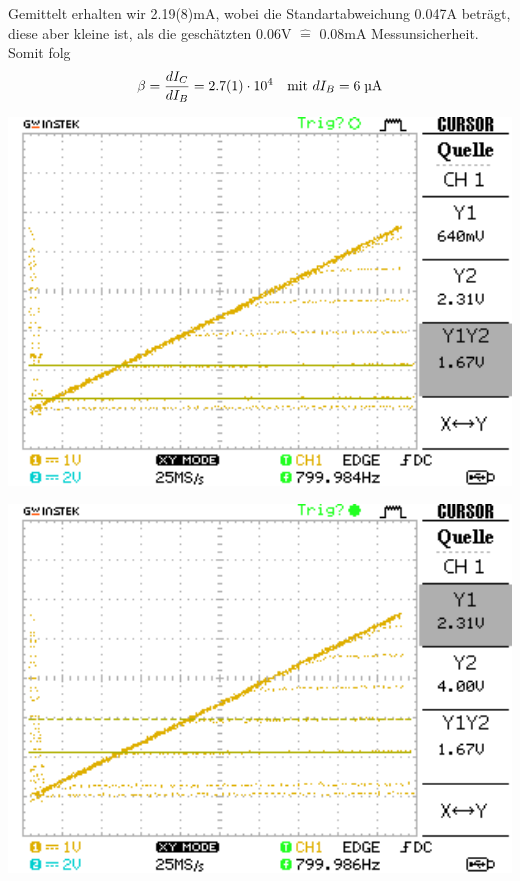 \documentclass[10pt]{article}
\newenvironment{Figure}
  {\par\medskip\noindent\minipage{\linewidth}}
  {\endminipage\par\medskip}
\begin{document}
\begin{multicols}{2}
\begin{center}
		\label{Tab:1.1}
	\end{center}
  Gemittelt erhalten wir 2.19(8)\;mA, wobei die Standartabweichung 0.047\;A beträgt, diese aber kleine ist, als die geschätzten 0.06\;V $\hat{=}$ 0.08\;mA Messunsicherheit. Somit folg
	\begin{align*}
		\beta & = \frac{dI_C}{dI_B} = 2.7(1) \cdot 10^4 & \text{mit } dI_B = 6\text{\;µA}
	\end{align*}
	\begin{Figure}
		\centering\includegraphics[width=1\textwidth]{data/Kennlinie1_npn.png}
		\label{fig:1.2}
	\end{Figure}
	\begin{Figure}
		\centering\includegraphics[width=1\textwidth]{data/Kennlinie2_npn.png}

\end{Figure}
\end{multicols}
\end{document}
